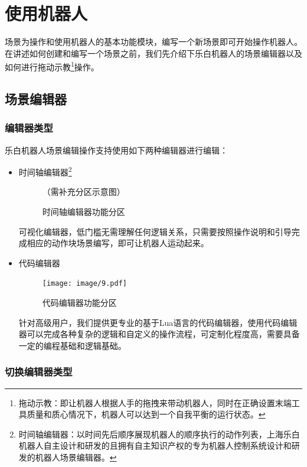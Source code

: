 \chapter{使用机器人}

场景为操作和使用机器人的基本功能模块，编写一个新场景即可开始操作机器人。在讲述如何创建和编写一个场景之前，我们先介绍下乐白机器人的场景编辑器以及如何进行拖动示教\footnote{拖动示教：即让机器人根据人手的拖拽来带动机器人，同时在正确设置末端工具质量和质心情况下，机器人可以达到一个自我平衡的运行状态。}操作。
\section{场景编辑器}
\subsection{编辑器类型}
乐白机器人场景编辑操作支持使用如下两种编辑器进行编辑：
\begin{itemize}
	\item 时间轴编辑器\footnote{时间轴编辑器：以时间先后顺序展现机器人的顺序执行的动作列表，上海乐白机器人自主设计和研发的且拥有自主知识产权的专为机器人控制系统设计和研发的机器人场景编辑器。}

	\begin{figure}[ht]
		\centering
		\color{red}（需补充分区示意图）
		\caption{时间轴编辑器功能分区}
		\label{fig:时间轴编辑器功能分区}
	\end{figure}

	可视化编辑器，低门槛无需理解任何逻辑关系，只需要按照操作说明和引导完成相应的动作块场景编写，即可让机器人运动起来。

	\item 代码编辑器
	
	\begin{figure}[ht]
		\centering
		\texttt{[image: image/9.pdf]}
		\caption{代码编辑器功能分区}
		\label{fig:代码编辑器功能分区}
	\end{figure}

	针对高级用户，我们提供更专业的基于Lua语言的代码编辑器，使用代码编辑器可以完成各种复杂的逻辑和自定义的操作流程，可定制化程度高，需要具备一定的编程基础和逻辑基础。

\end{itemize}

\subsection{切换编辑器类型}

